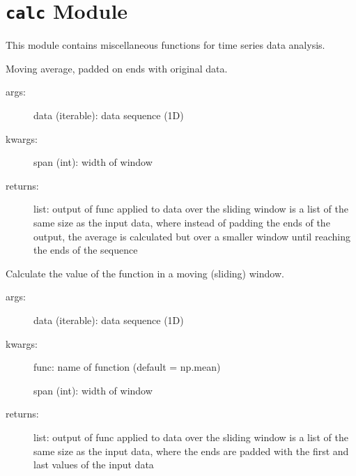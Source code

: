 \documentclass[letterpaper,10pt,openany,oneside]{sphinxmanual}
\begin{document}
\chapter{\texttt{calc} Module}
\label{index:module-calc}\label{index:calc-module}
This module contains miscellaneous functions for time series data analysis.

\begin{fulllineitems}
\label{index:calc.fullmovingavg}
Moving average, padded on ends with original data.
\begin{description}
\item[{args:}] \leavevmode
data (iterable): data sequence (1D)

\item[{kwargs:}] \leavevmode
span (int): width of window

\item[{returns:}] \leavevmode
list: output of func applied to data over the sliding window is a list  
of the same size as the input data, where instead of padding the ends 
of the output, the average is calculated but over a smaller window 
until reaching the ends of the sequence

\end{description}

\end{fulllineitems}


\begin{fulllineitems}
\label{index:calc.moving}
Calculate the value of the function in a moving (sliding) window.
\begin{description}
\item[{args:}] \leavevmode
data (iterable): data sequence (1D)

\item[{kwargs:}] \leavevmode
func: name of function (default = np.mean)

span (int): width of window

\item[{returns:}] \leavevmode
list: output of func applied to data over the sliding window is a list 
of the same size as the input data, where the ends are padded with the 
first and last values of the input data

\end{description}

\end{fulllineitems}
\end{document}
